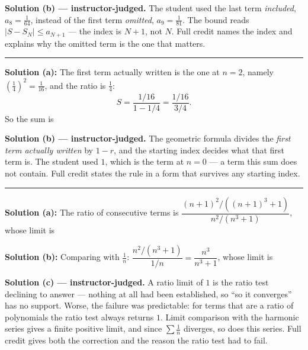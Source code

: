 \documentclass[12pt]{article}
\begin{document}
\textbf{Solution (b) --- instructor-judged.} The student used the last term \emph{included}, $a_8 = \frac{1}{64}$, instead of the first term \emph{omitted}, $a_9 = \frac{1}{81}$. The bound reads $|S - S_N| \le a_{N+1}$ --- the index is $N+1$, not $N$. Full credit names the index and explains why the omitted term is the one that matters.

\vspace{0.2cm}\noindent\rule{\linewidth}{0.2pt}\vspace{0.2cm}


\textbf{Solution (a):} The first term actually written is the one at $n = 2$, namely $\left(\frac14\right)^2 = \frac{1}{16}$, and the ratio is $\frac14$:
\[ S = \frac{1/16}{1 - 1/4} = \frac{1/16}{3/4}. \]
So the sum is 

\textbf{Solution (b) --- instructor-judged.} The geometric formula divides the \emph{first term actually written} by $1 - r$, and the starting index decides what that first term is. The student used $1$, which is the term at $n = 0$ --- a term this sum does not contain. Full credit states the rule in a form that survives any starting index.

\vspace{0.2cm}\noindent\rule{\linewidth}{0.2pt}\vspace{0.2cm}


\textbf{Solution (a):} The ratio of consecutive terms is $\dfrac{(n+1)^2/((n+1)^3+1)}{n^2/(n^3+1)}$, whose limit is 

\textbf{Solution (b):} Comparing with $\frac1n$: $\dfrac{n^2/(n^3+1)}{1/n} = \dfrac{n^3}{n^3+1}$, whose limit is 

\textbf{Solution (c) --- instructor-judged.} A ratio limit of $1$ is the ratio test declining to answer --- nothing at all had been established, so ``so it converges'' has no support. Worse, the failure was predictable: for terms that are a ratio of polynomials the ratio test always returns $1$. Limit comparison with the harmonic series gives a finite positive limit, and since $\sum \frac1n$ diverges, so does this series. Full credit gives both the correction and the reason the ratio test had to fail.
\end{document}
